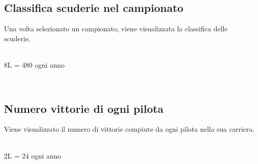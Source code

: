 \documentclass[a4paper,12pt]{report}
\begin{document}
			\subsection{Classifica scuderie nel campionato}
			{\fontsize{12.5}{20}\selectfont
			Una volta selezionato un campionato, viene visualizzata la classifica delle scuderie.}
			\begin{table}[!htb]
				\centering
				\begin{center}
				\newline\\
				8L = 480 ogni anno\\
				\end{center}
			\end{table}\\
			\pagebreak
			\subsection{Numero vittorie di ogni pilota}
			{\fontsize{12.5}{20}\selectfont
			Viene visualizzato il numero di vittorie compiute da ogni pilota nella sua carriera.}
			\begin{table}[!htb]
				\centering
				\begin{center}
				\newline\\
				2L = 24 ogni anno\\
				\end{center}
			\end{table}\\
\end{document}
